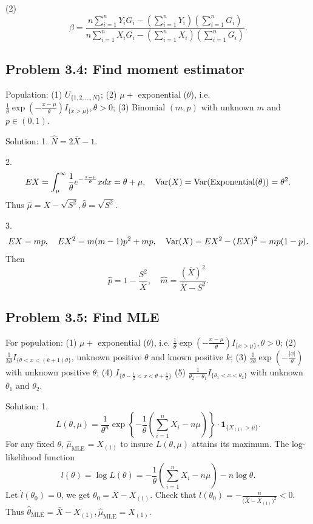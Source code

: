 (2)
\[
\beta=\frac{n\sum_{i=1}^{n}Y_{i}G_{i}-(\sum_{i=1}^{n}Y_{i})\left(\sum_{i=1}^{n}G_{i}\right)}{n\sum_{i=1}^{n}X_{i}G_{i}-(\sum_{i=1}^{n}X_{i})\left(\sum_{i=1}^{n}G_{i}\right)}.
\]


\subsection*{Problem 3.4: Find moment estimator}
Population:
(1) $U_{\{1,2,\ldots,N\}}$;
(2) $\mu+$ exponential ($\theta$), i.e. $\frac{1}{\theta}\exp\left(-\frac{x-\mu}{\theta}\right)I_{\{x>\mu\}},\theta>0$;
(3) Binomial $(m,p)$ with unknown $m$ and $p\in(0,1)$.

{Solution:}
1. $\hat{N}=2\bar{X}-1$.

2.
\[
EX=\int_{\mu}^{\infty}\frac{1}{\theta}e^{-\frac{x-\mu}{\theta}}xdx=\theta+\mu, \quad \operatorname{Var}(X)=\operatorname{Var}(\text{Exponential}(\theta))=\theta^{2}.
\]
Thus $\hat{\mu}=\bar{X}-\sqrt{S^{2}},\hat{\theta}=\sqrt{S^{2}}$.

3.
\[
EX=mp, \quad EX^{2}=m(m-1)p^{2}+mp, \quad \operatorname{Var}(X)=EX^{2}-(EX)^{2}=mp(1-p).
\]
Then
\[
\hat{p}=1-\frac{S^{2}}{\bar{X}}, \quad \hat{m}=\frac{(\bar{X})^{2}}{\bar{X}-S^{2}}.
\]

\subsection*{Problem 3.5: Find MLE}
For population:
(1) $\mu+$ exponential ($\theta$), i.e. $\frac{1}{\theta}\exp\left(-\frac{x-\mu}{\theta}\right)I_{\{x>\mu\}},\theta>0$;
(2) $\frac{1}{k\theta}I_{\{\theta<x<(k+1)\theta\}}$, unknown positive $\theta$ and known positive $k$;
(3) $\frac{1}{2\theta}\exp\left(-\frac{|x|}{\theta}\right)$ with unknown positive $\theta$;
(4) $I_{\{\theta-\frac{1}{2}<x<\theta+\frac{1}{2}\}}$
(5) $\frac{1}{\theta_{2}-\theta_{1}}I_{\{\theta_{1}<x<\theta_{2}\}}$ with unknown $\theta_{1}$ and $\theta_{2}$.

{Solution:}
1.
\[
L(\theta,\mu)=\frac{1}{\theta^{n}}\exp\left\{-\frac{1}{\theta}\left(\sum_{i=1}^{n}X_{i}-n\mu\right)\right\}\cdot \mathbf{1}_{\{X_{(1)}>\mu\}}.
\]
For any fixed $\theta$, $\hat{\mu}_{\text{MLE}}=X_{(1)}$ to insure $L(\theta,\mu)$ attains its maximum. The log-likelihood function
\[
l(\theta)=\log L(\theta)=-\frac{1}{\theta}\left(\sum_{i=1}^{n}X_{i}-n\mu\right)-n\log\theta.
\]
Let $\dot{l}(\theta_0)=0$, we get $\theta_0=\bar{X}-X_{(1)}$. Check that $\ddot{l}(\theta_0)=-\frac{n}{\big(\bar{X}-X_{(1)}\big)^{2}}<0$. Thus $\hat{\theta}_{\text{MLE}}=\bar{X}-X_{(1)},\hat{\mu}_{\text{MLE}}=X_{(1)}$.

